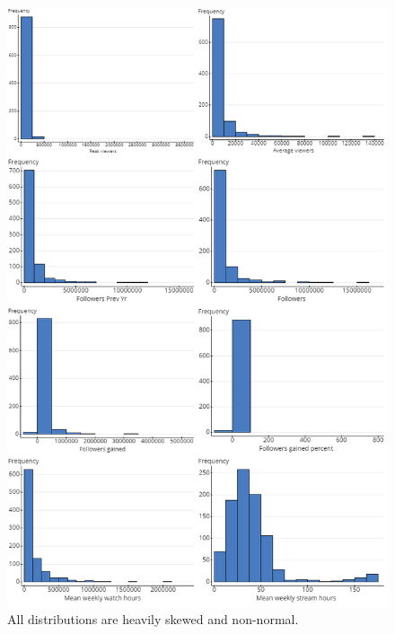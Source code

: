 \documentclass[12pt]{article}
\begin{document}
\begin{figure}[H]
  \centering
  \includegraphics[width=0.8\linewidth]{../StatCrunch_Results/Histogram_Matrix.png}
  \captionsetup{justification=centering, singlelinecheck=false, margin=2cm}
  \caption[Histogram Matrix]{All distributions are heavily skewed and non-normal.}
  \label{fig:histogram_matrix}
\end{figure}
\end{document}
